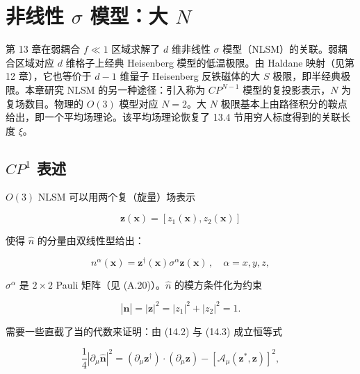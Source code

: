 \chapter{非线性 $\sigma$ 模型：大 $N$}

第 13 章在弱耦合 $f \ll 1$ 区域求解了 $d$ 维非线性 {$\sigma$} 模型（NLSM）的关联。弱耦合区域对应 $d$ 维格子上经典 Heisenberg 模型的低温极限。由 Haldane 映射（见第 12 章），它也等价于 $d-1$ 维量子 Heisenberg 反铁磁体的大 $S$ 极限，即半经典极限。本章研究 NLSM 的另一种途径：引入称为 $CP^{N-1}$ 模型的复投影表示，$N$ 为复场数目。物理的 $O(3)$ 模型对应 $N = 2$。大 $N$ 极限基本上由路径积分的鞍点给出，即一个平均场理论。该平均场理论恢复了 13.4 节用穷人标度得到的关联长度 $\xi$。

\section{$CP^1$ 表述}

$O(3)$ NLSM 可以用两个复（旋量）场表示

\begin{equation*}
\mathbf {z} ( \mathbf {x} ) = \left[ z _ {1} ( \mathbf {x} ), z _ {2} ( \mathbf {x} ) \right]
\tag{14.1}
\end{equation*}

使得 $\hat{n}$ 的分量由双线性型给出：

\begin{equation*}
n ^ {\alpha} ( \mathbf {x} ) = \mathbf {z} ^ {\dagger} ( \mathbf {x} ) \sigma^ {\alpha} \mathbf {z} ( \mathbf {x} ) \, , \quad \alpha = x, y, z ,
\tag{14.2}
\end{equation*}

$\sigma^{\alpha}$ 是 $2\times2$ Pauli 矩阵（见 (A.20)）。$\hat{n}$ 的模方条件化为约束

\begin{equation*}
| \hat {\mathbf {n}} | = | \mathbf {z} | ^ {2} = | z _ {1} | ^ {2} + | z _ {2} | ^ {2} = 1.
\tag{14.3}
\end{equation*}

需要一些直截了当的代数来证明：由 (14.2) 与 (14.3) 成立恒等式

\begin{equation*}
\frac {1}{4} \left| \partial_ {\mu} \hat {\mathbf {n}} \right| ^ {2} = \left( \partial_ {\mu} \mathbf {z} ^ {\dagger} \right) \cdot \left( \partial_ {\mu} \mathbf {z} \right) - \left[ \mathcal {A} _ {\mu} ( \mathbf {z} ^ {*}, \mathbf {z} ) \right] ^ {2} ,
\tag{14.4}
\end{equation*}

